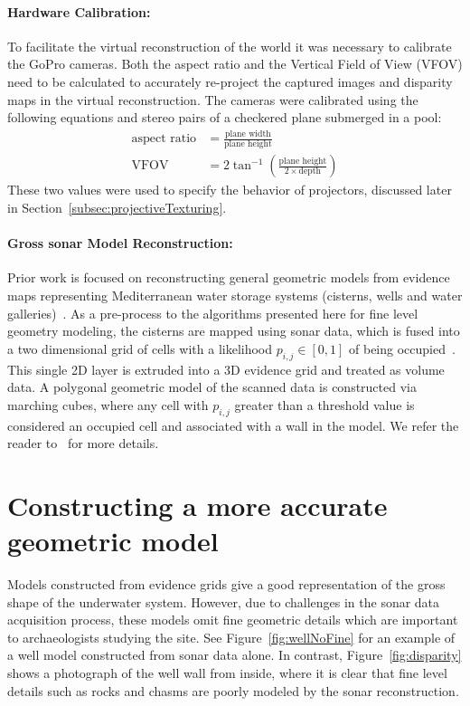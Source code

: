 \documentclass{llncs}
\begin{document}
\paragraph{\textbf{Hardware Calibration:}}
To facilitate the virtual reconstruction of the world it was necessary to calibrate the GoPro cameras.
Both the aspect ratio and the Vertical Field of View (VFOV) need to be calculated to accurately re-project the captured images and disparity maps in the virtual reconstruction.
The cameras were calibrated using the following equations and stereo pairs of a checkered plane submerged in a pool:
\begin{align}
\text{aspect ratio} &= \frac{\text{plane width}}{\text{plane height}} \\
\text{VFOV} &= 2\tan^{-1}\left({\frac{\text{plane height}}{2 \times \text{depth}}}\right)
\end{align}
These two values were used to specify the behavior of projectors, discussed later in Section~\ref{subsec:projectiveTexturing}.

\paragraph{\textbf{Gross sonar Model Reconstruction:}}
\label{sec:reconstruction}
\noindent Prior work is focused on reconstructing general geometric models from evidence maps representing Mediterranean water storage systems (cisterns, wells and water galleries)~\cite{ICEX11,McVicker}. As a pre-process to the algorithms presented here for fine level geometry modeling, the cisterns are mapped using sonar data, which is fused into a two dimensional grid of cells with a likelihood $p_{i,j} \in [0,1]$ of being occupied~\cite{Thrun2005,White10}. This single 2D layer is extruded into a 3D evidence grid and treated as volume data. A polygonal geometric model of the scanned data is constructed via marching cubes, where any cell with $p_{i,j}$ greater than a threshold value is considered an occupied cell and associated with a wall in the model.
We refer the reader to~\cite{ICEX11,McVicker} for more details.

\section{Constructing a more accurate geometric model}
\label{sec:detail}
\noindent Models constructed from evidence grids give a good representation of the gross shape of the underwater system. However, due to challenges in the sonar data acquisition process, these models omit fine geometric details which are important to archaeologists studying the site. See Figure~\ref{fig:wellNoFine} for an example of a well model constructed from sonar data alone. In contrast, Figure~\ref{fig:disparity} shows a photograph of the well wall from inside, where it is clear that fine level details such as rocks and chasms are poorly modeled by the sonar reconstruction.
\end{document}
